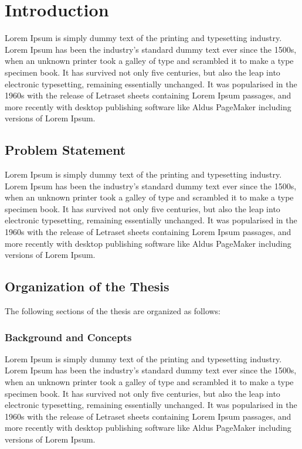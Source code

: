 \chapter{Introduction}

\label{Introduction}
Lorem Ipsum is simply dummy text of the printing and typesetting industry. Lorem Ipsum has been the industry's standard dummy text ever since the 1500s, when an unknown printer took a galley of type and scrambled it to make a type specimen book. It has survived not only five centuries, but also the leap into electronic typesetting, remaining essentially unchanged. It was popularised in the 1960s with the release of Letraset sheets containing Lorem Ipsum passages, and more recently with desktop publishing software like Aldus PageMaker including versions of Lorem Ipsum.


\section{Problem Statement}
\label{ProblemStatement}
Lorem Ipsum is simply dummy text of the printing and typesetting industry. Lorem Ipsum has been the industry's standard dummy text ever since the 1500s, when an unknown printer took a galley of type and scrambled it to make a type specimen book. It has survived not only five centuries, but also the leap into electronic typesetting, remaining essentially unchanged. It was popularised in the 1960s with the release of Letraset sheets containing Lorem Ipsum passages, and more recently with desktop publishing software like Aldus PageMaker including versions of Lorem Ipsum.


\section{Organization of the Thesis}

The following sections of the thesis are organized as follows:

\subsection{Background and Concepts}
Lorem Ipsum is simply dummy text of the printing and typesetting industry. Lorem Ipsum has been the industry's standard dummy text ever since the 1500s, when an unknown printer took a galley of type and scrambled it to make a type specimen book. It has survived not only five centuries, but also the leap into electronic typesetting, remaining essentially unchanged. It was popularised in the 1960s with the release of Letraset sheets containing Lorem Ipsum passages, and more recently with desktop publishing software like Aldus PageMaker including versions of Lorem Ipsum.



